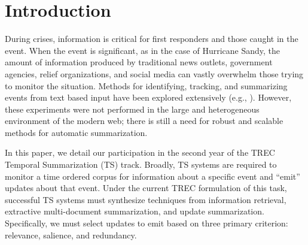 \documentclass[10pt]{article} \usepackage{url} \usepackage{color}
\begin{document}



\section{Introduction}

During crises, information is critical for first responders and those caught
in the event.  When the event is significant, as in the case of Hurricane
Sandy, the amount of information produced by traditional news outlets,
government agencies, relief organizations, and social media can vastly
overwhelm those trying to monitor the situation. Methods for identifying,
tracking, and summarizing events from text based input have been explored
extensively  (e.g.,
\cite{allan1998topic,Filatova&Hatzivassiloglou.04a,Wang&al.11}). However,
these experiments were not performed in the large and heterogeneous
environment of the modern web; there is still a need for robust and scalable 
methods for automatic summarization.




In this paper, we detail our participation in the second year of the TREC
Temporal Summarization (TS) track. Broadly, TS systems are required to monitor
a time ordered corpus for information about a specific event and ``emit'' 
updates about that event. Under the current TREC formulation of this task,
successful TS systems must synthesize techniques from information retrieval,
 extractive multi-document summarization, and update summarization.
Specifically, we must select updates to emit based on three primary criterion:
relevance, salience, and redundancy.
\end{document}
